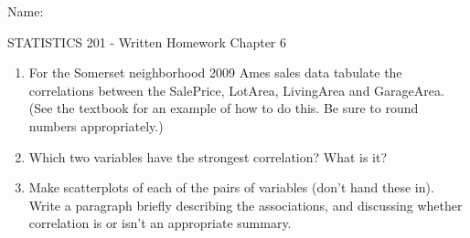 \documentclass{article}
\begin{document}
\hspace{2in} Name: \underline{\mbox{\hspace{3.5in}}}\\

\begin{center}
{\large STATISTICS 201 - Written Homework Chapter 6}\\[3mm]
\end{center}

\begin{enumerate}
\item For the Somerset neighborhood 2009 Ames sales data tabulate the correlations between the SalePrice, LotArea, LivingArea and GarageArea. (See the textbook for an example of how to do this. Be sure to round numbers appropriately.)

\vspace{2.5in}

\item Which two variables have the strongest correlation? What is it?

\vspace{1in}

\item Make scatterplots of each of the pairs of variables (don't hand these in). Write a paragraph briefly describing the associations, and discussing whether correlation is  or isn't an appropriate summary.

\end{enumerate}
\end{document}
